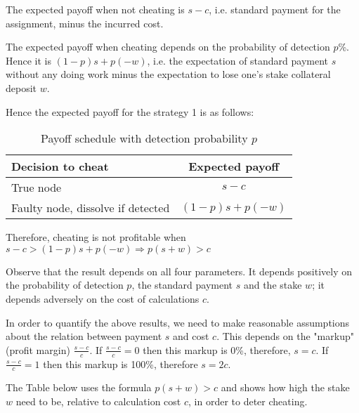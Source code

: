 \documentclass{article}
\begin{document}
The expected payoff when not cheating is $s-c$, i.e. standard payment for the assignment, minus the incurred cost.

The expected payoff when cheating depends on the probability of detection $p$\%. Hence it is $(1-p)s+p(-w)$, i.e. the expectation of standard payment $s$ without any doing work minus the expectation to lose one's stake collateral deposit $w$.

Hence the expected payoff for the strategy 1 is as follows:

\begin{table}[h]
    \caption{Payoff schedule with detection probability $p$}
    \label{table:settlement}
    \begin{adjustbox}{center}
        \begin{tabular}{l c}
            \toprule
            Decision to cheat & Expected payoff \\
            \midrule
            True node & $s-c$ \\
            Faulty node, dissolve if detected & $(1-p)s+p(-w)$ \\
            \bottomrule
        \end{tabular}
    \end{adjustbox}
\end{table}

Therefore, cheating is not profitable when $s-c>(1-p)s+p(-w) \Longrightarrow p(s+w)>c$

Observe that the result depends on all four parameters. It depends positively on the probability of detection $p$, the standard payment $s$ and the stake $w$; it depends adversely on the cost of calculations $c$.

In order to quantify the above results, we need to make reasonable assumptions about the relation between payment $s$ and cost $c$. This depends on the "markup" (profit margin) $\frac{s-c}{c}$. If $\frac{s-c}{c}=0$ then this markup is 0\%, therefore, $s=c$. If $\frac{s-c}{c}=1$ then this
markup is 100\%, therefore $s=2c$.

The Table below uses the formula $p(s+w)>c$ and shows how high the stake $w$ need to be, relative to calculation cost $c$, in order to deter cheating.
\end{document}
